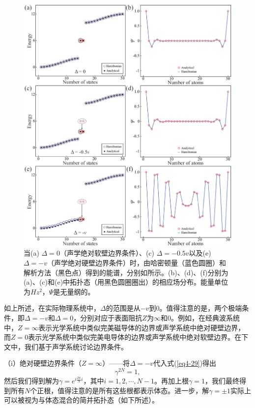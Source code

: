 \begin{figure}[h!]
    \centering
    \includegraphics[width=1\textwidth]{images/fig4-5.eps} 
    \caption{当(a) $\Delta = 0$（声学绝对软壁边界条件）、(c) $\Delta = -0.5v$以及(e) $\Delta = -v$（声学绝对硬壁边界条件）时，由哈密顿量（蓝色圆圈）和解析方法（黑色点）得到的能谱，分别如所示。(b)、(d)、(f)分别为(a)、(c)和(e)中拓扑态（用黑色圆圈圈出）的相应场分布。能量单位为$Hz^2$，$\Psi$是无量纲的。}
    \label{fig_4_5}
\end{figure} 

如上所述，在实际物理系统中，\(\Delta\)的范围是从\(-v\)到\(0\)。值得注意的是，两个极端条件，即\(\Delta = -v\)和\(\Delta = 0\)，分别对应于表面阻抗\(Z\)为\(\infty\)和\(0\)。例如，在经典波系统中，\(Z=\infty\)表示光学系统中类似完美磁导体的边界或声学系统中绝对硬壁边界，而\(Z = 0\)表示光学系统中类似完美电导体的边界或声学系统中绝对软壁边界。在下文中，我们基于声学系统讨论边界条件。

（i）绝对硬壁边界条件（\(Z=\infty\)）——将\(\Delta = -v\)代入式(\ref{eq4-29})得出
\begin{equation}
    \gamma^{2N}=1,
\end{equation}
然后我们得到解为\(\gamma = e^{i\frac{2\pi}{N}i}\)，其中\(i = 1,2,\cdots,N - 1\)。再加上根\(\gamma = 1\)，我们最终得到所有\(N\)个正根，值得注意的是所有这些根都表示体态。进一步，解\(\gamma=\pm1\)实际上可以被视为与体态混合的简并拓扑态（如下所述）。

